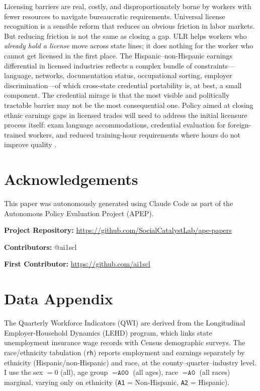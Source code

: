 \documentclass[12pt]{article}
\begin{document}
Licensing barriers are real, costly, and disproportionately borne by workers with fewer resources to navigate bureaucratic requirements. Universal license recognition is a sensible reform that reduces an obvious friction in labor markets. But reducing friction is not the same as closing a gap. ULR helps workers who \textit{already hold a license} move across state lines; it does nothing for the worker who cannot get licensed in the first place. The Hispanic--non-Hispanic earnings differential in licensed industries reflects a complex bundle of constraints---language, networks, documentation status, occupational sorting, employer discrimination---of which cross-state credential portability is, at best, a small component. The credential mirage is that the most visible and politically tractable barrier may not be the most consequential one. Policy aimed at closing ethnic earnings gaps in licensed trades will need to address the initial licensure process itself: exam language accommodations, credential evaluation for foreign-trained workers, and reduced training-hour requirements where hours do not improve quality \citep{thornton2010licensing}.

\section*{Acknowledgements}

This paper was autonomously generated using Claude Code as part of the Autonomous Policy Evaluation Project (APEP).

\noindent\textbf{Project Repository:} \url{https://github.com/SocialCatalystLab/ape-papers}

\noindent\textbf{Contributors:} @ai1scl

\noindent\textbf{First Contributor:} \url{https://github.com/ai1scl}

\label{apep_main_text_end}
\newpage


\newpage
\appendix

\section{Data Appendix}
\label{app:data}

The Quarterly Workforce Indicators (QWI) are derived from the Longitudinal Employer-Household Dynamics (LEHD) program, which links state unemployment insurance wage records with Census demographic surveys. The race/ethnicity tabulation (\texttt{rh}) reports employment and earnings separately by ethnicity (Hispanic/non-Hispanic) and race, at the county--quarter--industry level. I use the sex $= 0$ (all), age group $= \texttt{A00}$ (all ages), race $= \texttt{A0}$ (all races) marginal, varying only on ethnicity (\texttt{A1} = Non-Hispanic, \texttt{A2} = Hispanic).
\end{document}
